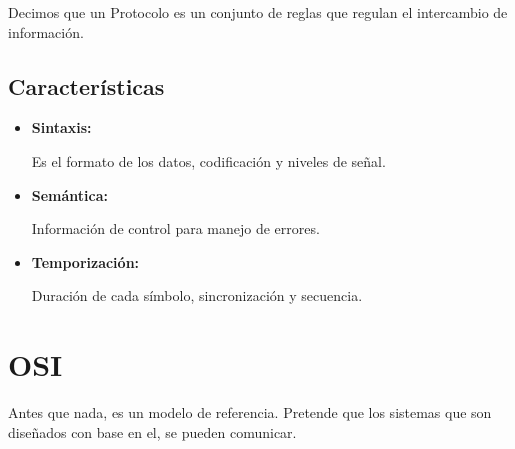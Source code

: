 \documentclass[12pt, fleqn]{report}                             %
\theoremstyle{break}                                            %
\begin{document}
            Decimos que un Protocolo es un conjunto de reglas que regulan el intercambio de información.

            \subsection{Características}

                \begin{itemize}
                    
                    \item \textbf{Sintaxis:}

                        Es el formato de los datos, codificación y niveles de señal.

                    \item \textbf{Semántica:}

                        Información de control para manejo de errores.

                    \item \textbf{Temporización:}

                        Duración de cada símbolo, sincronización y secuencia.

                \end{itemize}




        \clearpage
        \section{OSI}

            Antes que nada, es un modelo de referencia. Pretende que los sistemas que son diseñados
            con base en el, se pueden comunicar.
\end{document}
